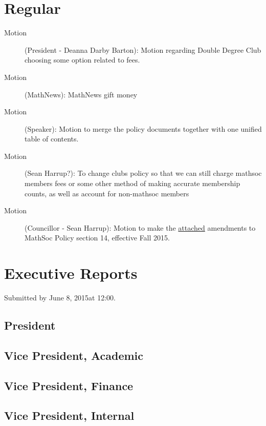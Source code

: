 \documentclass[12pt, letterpaper]{article}
\newcommand{\agendaDate}{June 8, 2015} %
\begin{document}
\section*{Regular}
\begin{description}
	\item[Motion] (President - Deanna Darby Barton): Motion regarding Double Degree Club choosing some option related to fees.
	\item[Motion] (MathNews): MathNews gift money
	\item[Motion] (Speaker): Motion to merge the policy documents together with one unified table of contents.
	\item[Motion] (Sean Harrup?): To change clubs policy so that we can still charge mathsoc members fees or some other method of making accurate membership counts, as well as account for non-mathsoc members
	\item[Motion] (Councillor - Sean Harrup): Motion to make the \hyperref[cif]{attached} amendments to MathSoc Policy section 14, effective Fall 2015.
	
\end{description}

\newpage


\newpage

\section*{Executive Reports}
Submitted by \agendaDate at 12:00.

\subsection*{President}


\subsection*{Vice President, Academic}


\subsection*{Vice President, Finance}


\subsection*{Vice President, Internal}

\end{document}
